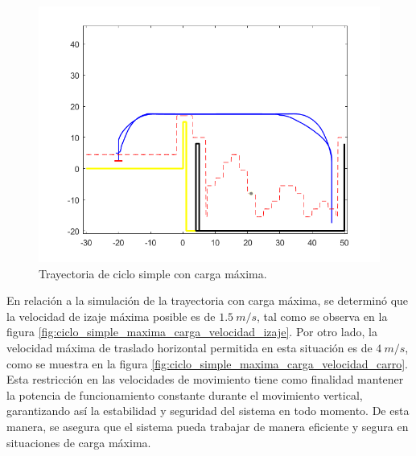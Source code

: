 \documentclass[11pt]{article}
\begin{document}
\begin{figure}[!h]
	\centering
	\includegraphics[width=1\textwidth]{images/ciclo_simple_maxima_carga/trayectoria_completa_xtd.png}
	\caption{Trayectoria de ciclo simple con carga máxima.}
	\label{fig:ciclo_simple_maxima_carga_trayectoria}
\end{figure}

En relación a la simulación de la trayectoria con carga máxima, se determinó que la velocidad de izaje máxima posible es de $1.5\ m/s$, tal como se observa en la figura \ref{fig:ciclo_simple_maxima_carga_velocidad_izaje}. Por otro lado, la velocidad máxima de traslado horizontal permitida en esta situación es de $4\ m/s$, como se muestra en la figura \ref{fig:ciclo_simple_maxima_carga_velocidad_carro}. Esta restricción en las velocidades de movimiento tiene como finalidad mantener la potencia de funcionamiento constante durante el movimiento vertical, garantizando así la estabilidad y seguridad del sistema en todo momento. De esta manera, se asegura que el sistema pueda trabajar de manera eficiente y segura en situaciones de carga máxima.
\end{document}
